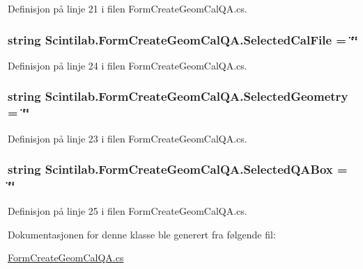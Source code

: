Definisjon på linje 21 i filen Form\+Create\+Geom\+Cal\+Q\+A.\+cs.

\hypertarget{class_scintilab_1_1_form_create_geom_cal_q_a_ad3866120471b431cc990241a9a1e51b2}{
\subsubsection[{Selected\+Cal\+File}]{\setlength{\rightskip}{0pt plus 5cm}string Scintilab.\+Form\+Create\+Geom\+Cal\+Q\+A.\+Selected\+Cal\+File = \char`\"{}\char`\"{}}}\label{class_scintilab_1_1_form_create_geom_cal_q_a_ad3866120471b431cc990241a9a1e51b2}


Definisjon på linje 24 i filen Form\+Create\+Geom\+Cal\+Q\+A.\+cs.

\hypertarget{class_scintilab_1_1_form_create_geom_cal_q_a_aa64c1cbe52c5249ba95a35619a73ceb4}{
\subsubsection[{Selected\+Geometry}]{\setlength{\rightskip}{0pt plus 5cm}string Scintilab.\+Form\+Create\+Geom\+Cal\+Q\+A.\+Selected\+Geometry = \char`\"{}\char`\"{}}}\label{class_scintilab_1_1_form_create_geom_cal_q_a_aa64c1cbe52c5249ba95a35619a73ceb4}


Definisjon på linje 23 i filen Form\+Create\+Geom\+Cal\+Q\+A.\+cs.

\hypertarget{class_scintilab_1_1_form_create_geom_cal_q_a_a5ad3da48ae5babf6d8766ebc2d9e1ad2}{
\subsubsection[{Selected\+Q\+A\+Box}]{\setlength{\rightskip}{0pt plus 5cm}string Scintilab.\+Form\+Create\+Geom\+Cal\+Q\+A.\+Selected\+Q\+A\+Box = \char`\"{}\char`\"{}}}\label{class_scintilab_1_1_form_create_geom_cal_q_a_a5ad3da48ae5babf6d8766ebc2d9e1ad2}


Definisjon på linje 25 i filen Form\+Create\+Geom\+Cal\+Q\+A.\+cs.



Dokumentasjonen for denne klasse ble generert fra følgende fil\+:\begin{DoxyCompactItemize}
\item 
\hyperlink{_form_create_geom_cal_q_a_8cs}{Form\+Create\+Geom\+Cal\+Q\+A.\+cs}\end{DoxyCompactItemize}
